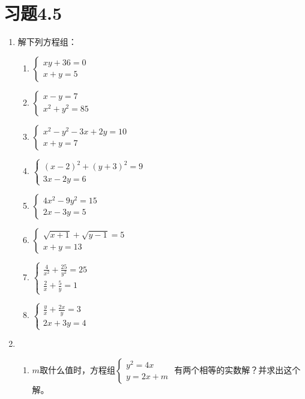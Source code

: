 \section*{习题4.5}
\begin{enumerate}
    \item 解下列方程组：
\begin{multicols}{2}
\begin{enumerate}
    \item $\begin{cases}
        xy+36=0\\x+y=5
    \end{cases}$
    \item $\begin{cases}
        x-y=7\\x^2+y^2=85
    \end{cases}$
    \item $\begin{cases}
        x^2-y^2-3x+2y=10\\x+y=7
    \end{cases}$
    \item $\begin{cases}
        (x-2)^2+(y+3)^2=9\\ 3x-2y=6
    \end{cases}$
    \item $\begin{cases}
        4x^2-9y^2=15\\ 2x-3y=5
    \end{cases}$
    \item $\begin{cases}
        \sqrt{x+1}+\sqrt{y-1}=5\\ x+y=13
    \end{cases}$
    \item $\begin{cases}
        \frac{4}{x^2}+\frac{25}{y^2}=25\\
        \frac{2}{x}+\frac{5}{y}=1
    \end{cases}$
    \item $\begin{cases}
        \frac{y}{x}+\frac{2x}{y}=3\\
        2x+3y=4
    \end{cases}$

\end{enumerate}
\end{multicols}

\item \begin{enumerate}
    \item $m$取什么值时，方程组$\begin{cases}
        y^2=4x\\y=2x+m
    \end{cases}$
有两个相等的实数解？并求出这个解。


\end{enumerate}
\end{enumerate}
